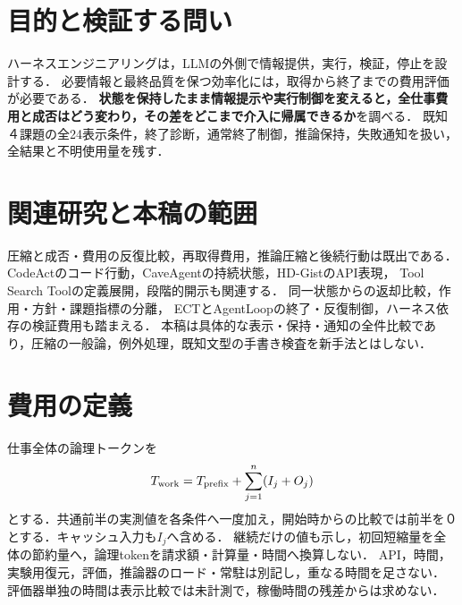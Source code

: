 \documentclass[letter]{ieicej}
\begin{document}
\maketitle
\begin{abstract}

\end{abstract}
\begin{keyword}\LetterJapaneseKeywords\end{keyword}
\begin{eabstract}

\end{eabstract}
\begin{ekeyword}\LetterEnglishKeywords\end{ekeyword}
\section{目的と検証する問い}
ハーネスエンジニアリングは，LLMの外側で情報提供，実行，検証，停止を設計する．
必要情報と最終品質を保つ効率化には，取得から終了までの費用評価が必要である．
\textbf{状態を保持したまま情報提示や実行制御を変えると，全仕事費用と成否はどう変わり，その差をどこまで介入に帰属できるか}を調べる．
既知４課題の全24表示条件，終了診断，通常終了制御，推論保持，失敗通知を扱い，全結果と不明使用量を残す．

\section{関連研究と本稿の範囲}
圧縮と成否・費用の反復比較\cite{beyond}，再取得費用\cite{interaction}，推論圧縮と後続行動\cite{thinking}は既出である．
CodeAct\cite{codeact}のコード行動，CaveAgent\cite{cave}の持続状態，HD-Gist\cite{hdgist}のAPI表現，
Tool Search Tool\cite{toolsearch}の定義展開，段階的開示\cite{disclosure}も関連する．
同一状態からの返却比較\cite{evidence}，作用・方針・課題指標の分離\cite{matoi}，
ECT\cite{ect}とAgentLoop\cite{agentloop}の終了・反復制御，ハーネス依存の検証費用\cite{waste}も踏まえる．
本稿は具体的な表示・保持・通知の全件比較であり，圧縮の一般論，例外処理，既知文型の手書き検査を新手法とはしない．

\section{費用の定義}
仕事全体の論理トークンを
\begin{equation}
 T_{\rm work}=T_{\rm prefix}+\sum_{j=1}^{n}(I_j+O_j)
\end{equation}
とする．共通前半の実測値を各条件へ一度加え，開始時からの比較では前半を０とする．キャッシュ入力も$I_j$へ含める．
継続だけの値も示し，初回短縮量を全体の節約量へ，論理tokenを請求額・計算量・時間へ換算しない．
API，時間，実験用復元，評価，推論器のロード・常駐は別記し，重なる時間を足さない．
評価器単独の時間は表示比較では未計測で，稼働時間の残差からは求めない．
\end{document}
